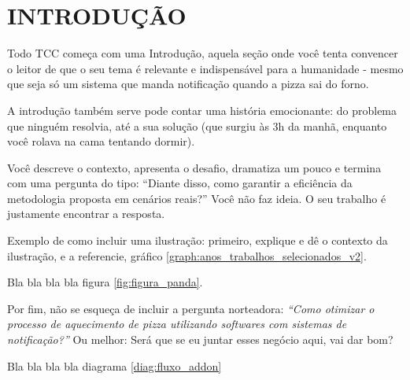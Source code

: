 \chapter{INTRODUÇÃO}
\label{chap:contextualizacao}

Todo TCC começa com uma Introdução, aquela seção onde você tenta convencer o leitor de que o seu tema é relevante e indispensável para a humanidade - mesmo que seja só um sistema que manda notificação quando a pizza sai do forno.

A introdução também serve pode contar uma história emocionante: do problema que ninguém resolvia, até a sua solução (que surgiu às 3h da manhã, enquanto você rolava na cama tentando dormir).

Você descreve o contexto, apresenta o desafio, dramatiza um pouco e termina com uma pergunta do tipo: \enquote{Diante disso, como garantir a eficiência da metodologia proposta em cenários reais?} Você não faz ideia. O seu trabalho é justamente encontrar a resposta.

Exemplo de como incluir uma ilustração: primeiro, explique e dê o contexto da ilustração, e a referencie, gráfico \ref{graph:anos_trabalhos_selecionados_v2}.



Bla bla bla bla figura \ref{fig:figura_panda}.



Por fim, não se esqueça de incluir a pergunta norteadora: \textit{\enquote{Como otimizar o processo de aquecimento de pizza utilizando softwares com sistemas de notificação?}} Ou melhor: Será que se eu juntar esses negócio aqui, vai dar bom?

Bla bla bla bla diagrama \ref{diag:fluxo_addon}









    